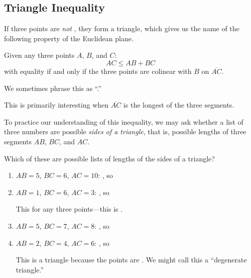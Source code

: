 \subsection{Triangle Inequality} 
If three points are \emph{not} \makeblank[1in], they form a triangle, which gives us the name of the following property of the Euclidean plane.
\begin{displaybox}
Given any three points $A$, $B$, and $C$:
\[
AC\leq AB+BC
\]
with equality if and only if the three points are colinear with $B$ on $\overline{AC}$.
\end{displaybox}
We sometimes phrase this as ``\makeblank[3.5in].''
\begin{Note}
This is primarily interesting when $\overline{AC}$ is the longest of the three segments.
\end{Note}
To practice our understanding of this inequality, we may ask whether a list of three numbers are possible \emph{sides of a triangle}, that is, possible lengths of three segments $AB$, $BC$, and $AC$.
\begin{Example}
Which of these are possible lists of lengths of the sides of a triangle?
\begin{enumerate}
\item $AB=5$, $BC=6$, $AC=10$: \makeblank, so \makeblanksmall
\item $AB=1$, $BC=6$, $AC=3$: \makeblank, so \makeblanksmall
\begin{Note}
This \makeblank[1.5in] for any three \makeblank[1in] points---this is \makeblank[1.5in].
\end{Note}
\item $AB=5$, $BC=7$, $AC=8$: \makeblank, so \makeblanksmall
\item $AB=2$, $BC=4$, $AC=6$: \makeblank, so \makeblanksmall
\begin{Note}
This is \makeblanksmall a triangle because the points are \makeblank[1in]. We might call this a ``degenerate triangle.''
\end{Note}
\end{enumerate}

\end{Example}